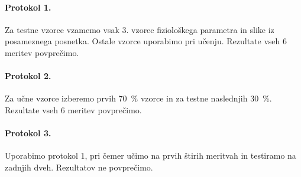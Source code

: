 \paragraph{Protokol 1.}
Za testne vzorce vzamemo vsak 3. vzorec fiziološkega parametra in slike iz posameznega posnetka. Ostale vzorce uporabimo pri učenju. Rezultate vseh 6 meritev povprečimo.

\paragraph{Protokol 2.}
Za učne vzorce izberemo prvih \SI{70}{\%} vzorce in za testne naslednjih \SI{30}{\%}. Rezultate vseh 6 meritev povprečimo.

\paragraph{Protokol 3.}
Uporabimo protokol 1, pri čemer učimo na prvih štirih meritvah in testiramo na zadnjih dveh. Rezultatov ne povprečimo.

